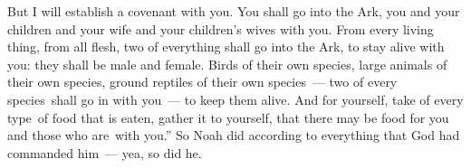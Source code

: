 \begin{inparaenum}
     But I will establish a covenant with you. You shall go into the Ark, you and your children and your wife and your children's wives with you.%
     From every living thing, from all flesh, two of everything shall go into the Ark, to stay alive with you: they shall be male and female.%
     Birds of their own species, large animals of their own species, ground reptiles of their own species~--- two of every species\understood\ shall go in with you~--- to keep them alive.%
     And for yourself, take of every type\understood\ of food that is eaten, gather it to yourself, that there may be food for you and those who are\understood\ with you.''%
     So Noah did according to everything that God had commanded him~--- yea, so did he.%
\end{inparaenum}
